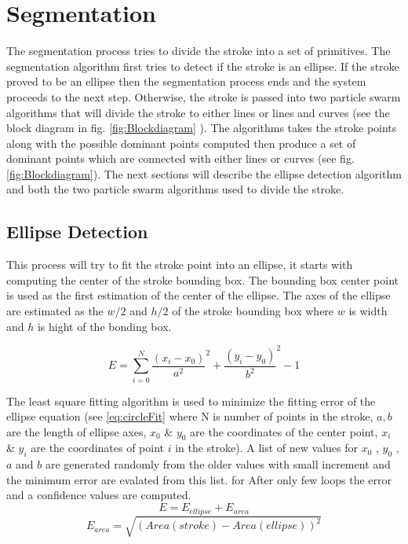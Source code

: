 \section{Segmentation}
\label{sec:Segmentation}
The segmentation process tries to divide the stroke into a set of primitives. The segmentation algorithm first tries to detect if the stroke is an ellipse. If the stroke proved to be an ellipse then the segmentation process ends and the system proceeds to the next step. Otherwise, the stroke is passed into two particle swarm algorithms that will divide the stroke to either lines or lines and curves (see the block diagram in fig. \ref{fig:Blockdiagram} ). The algorithms takes the stroke points along with the possible dominant points computed then produce a set of dominant points which are connected with either lines or curves (see fig. \ref{fig:Blockdiagram}).  The next sections will describe the ellipse detection algorithm and both the two particle swarm algorithms used to divide the stroke.


\subsection{Ellipse Detection }
\label{sec:EllipseDetection}
This process will try to fit the stroke point into an ellipse, it starts with computing the center of the stroke bounding box. The bounding box center point is used as the first estimation of the center of the ellipse. The axes of the ellipse are estimated as the $w/2$ and $h/2$ of the stroke bounding box where $w$ is width and $h$ is hight of the bonding box.  

\begin{equation}
E = \sum\limits_{i = 0}^N {\frac{{(x_i - x_0 )}}{{a^2 }}^2  + \frac{{(y_i - y_0 )}}{{b^2 }}^2  - 1} 
\label{eq:circleFit}
\end{equation}

 The least square fitting algorithm is used to minimize the fitting error of the ellipse equation (see \ref{eq:circleFit} where N is number of points in the stroke, $a,b$ are the length of ellipse axes, $x_0$ \& $y_0$ are the coordinates of the center point, $x_i$ \& $y_i$ are the coordinates of point $i$ in the stroke). A list of new values for $x_0$ , $y_0$ ,$a$ and $b$ are generated randomly from the older values with small increment and the minimum error are evalated from this list. for After only few loops the error and a confidence values  are computed.
 \begin{equation}
E = E_{ellipse}+E_{area}
\label{eq:circleError}
\end{equation}
 \begin{equation}
E_{area}  = \sqrt {\left( Area(stroke) - Area(ellipse)\right)^2 }
\label{eq:ErrorArea}
\end{equation}

